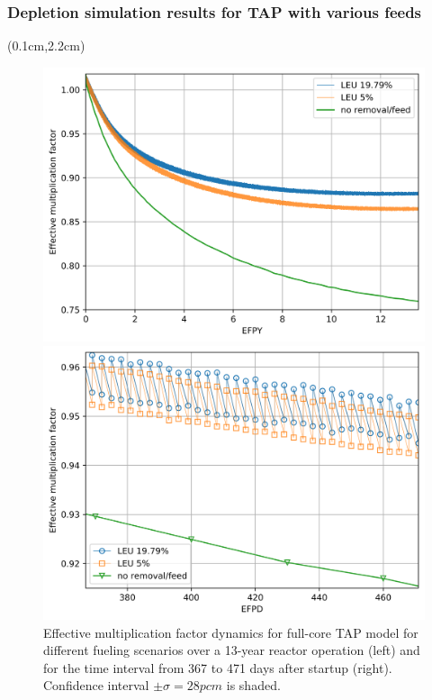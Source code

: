 \begin{frame}
\frametitle{Depletion simulation results for TAP with various feeds}       
\begin{textblock*}{12.6cm}(0.1cm,2.2cm) %
	\begin{figure}[htp!] %
		\begin{minipage}[b]{0.48\textwidth}
			\includegraphics[width=\linewidth]{./images/keff_3.png}
		\end{minipage}
			\hspace{-2mm}
		\begin{minipage}[b]{0.48\textwidth}
			\includegraphics[width=\linewidth]{./images/keff_zoomed_2.png}
		\end{minipage}
		\caption{Effective multiplication factor dynamics for full-core
		TAP model for different fueling scenarios over a 13-year reactor 
		operation (left) and for the time interval from 367 to 471 days after 
		startup (right). Confidence interval $\pm\sigma=28pcm$ is shaded.}
	\end{figure}
\end{textblock*}
\end{frame}



